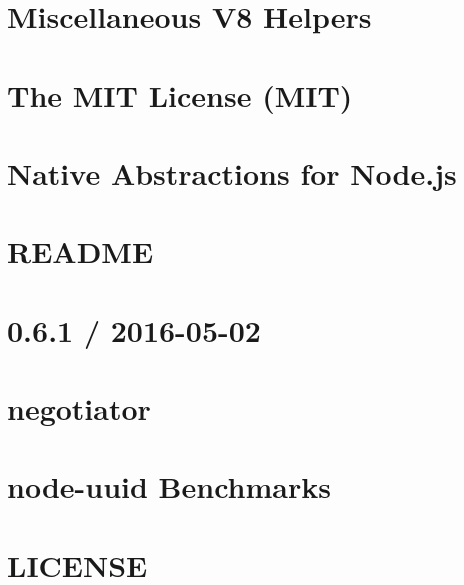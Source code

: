 \documentclass[twoside]{book}
\newcommand{\+}{\discretionary{\mbox{\scriptsize$\hookleftarrow$}}{}{}}
\begin{document}
\chapter{Miscellaneous V8 Helpers}
\label{md_app_web_node_modules_nan_doc_v8_misc}

\chapter{The M\+IT License (M\+IT)}
\label{md_app_web_node_modules_nan__l_i_c_e_n_s_e}

\chapter{Native Abstractions for Node.\+js}
\label{md_app_web_node_modules_nan__r_e_a_d_m_e}

\chapter{R\+E\+A\+D\+ME}
\label{md_app_web_node_modules_nan_tools__r_e_a_d_m_e}

\chapter{0.6.1 / 2016-\/05-\/02}
\label{md_app_web_node_modules_negotiator__h_i_s_t_o_r_y}

\chapter{negotiator}
\label{md_app_web_node_modules_negotiator__r_e_a_d_m_e}

\chapter{node-\/uuid Benchmarks}
\label{md_app_web_node_modules_node-uuid_benchmark__r_e_a_d_m_e}

\chapter{L\+I\+C\+E\+N\+SE}
\label{md_app_web_node_modules_node-uuid__l_i_c_e_n_s_e}

\end{document}
